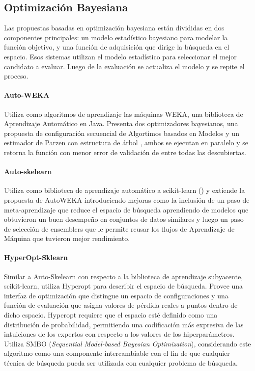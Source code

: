 \subsection{Optimizaci\'on Bayesiana}
Las propuestas basadas en optimizaci\'on bayesiana est\'an divididas en dos componentes principales: un modelo estad\'istico bayesiano para modelar la funci\'on objetivo, y una funci\'on de adquisici\'on que dirige la b\'usqueda en el espacio. Esos sistemas utilizan el modelo estad\'istico para seleccionar el mejor candidato a evaluar. Luego de la evaluaci\'on se actualiza el modelo y se repite el proceso.

\paragraph{Auto-WEKA } Utiliza como algoritmos de aprendizaje las m\'aquinas WEKA, una biblioteca de Aprendizaje Autom\'atico en Java. Presenta dos optimizadores bayesianos, una propuesta de configuraci\'on secuencial de Algortimos basados en Modelos   y un estimador de Parzen con estructura de \'arbol , ambos se ejecutan en paralelo y se retorna la funci\'on con menor error de validaci\'on de entre todas las descubiertas.

\paragraph*{Auto-skelearn } Utiliza como biblioteca de aprendizaje autom\'atico a scikit-learn () y extiende la propuesta de AutoWEKA  introduciendo mejoras como la inclusi\'on de un paso de meta-aprendizaje que reduce el espacio de b\'usqueda aprendiendo de modelos que obtuvieron un buen desempe\~no en conjuntos de datos similares y luego un paso de selecci\'on de ensemblers que le permite reusar los flujos de Aprendizaje de M\'aquina que tuvieron mejor rendimiento. 

\paragraph*{HyperOpt-Sklearn } Similar a Auto-Skelearn con respecto a la biblioteca de aprendizaje subyacente, scikit-learn, utiliza Hyperopt  para describir el espacio de b\'usqueda. Provee una interfaz de optimizaci\'on que distingue un espacio de configuraciones y una funci\'on de evaluaci\'on que asigna valores de p\'erdida reales a puntos dentro de dicho espacio. Hyperopt requiere que el espacio est\'e definido como una distribuci\'on de probabilidad, permitiendo una codificaci\'on m\'as expresiva de las intuiciones de los expertos con respecto a los valores de los hiperpar\'ametros. Utiliza SMBO (\textit{Sequential Model-based Bayesian Optimization}), considerando este algoritmo como una componente intercambiable con el fin de que cualquier t\'ecnica de b\'usqueda pueda ser utilizada con cualquier problema de b\'usqueda.

